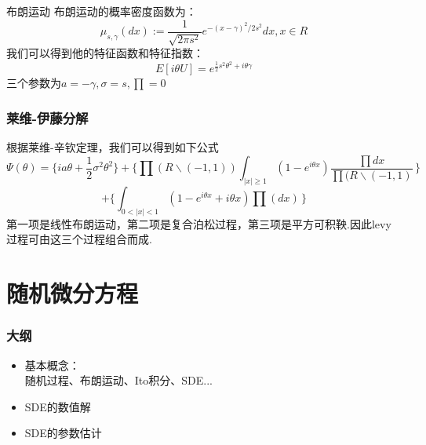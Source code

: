 \documentclass{beamer}
\begin{document}
\begin{frame}
布朗运动\newline\newline
布朗运动的概率密度函数为：\[\mu_{s,\gamma}(dx):=\frac{1}{\sqrt{2\pi s^{2}}}e^{-(x-\gamma)^{2}/2s^{2}}dx ,x \in R\]我们可以得到他的特征函数和特征指数：\[E[i\theta U]=e^{\frac{1}{2}s^{2}\theta^{2}+i\theta\gamma}\]三个参数为$a=-\gamma,\sigma=s,\prod=0$

\end{frame}

\begin{frame}
\frametitle{莱维-伊藤分解}


根据莱维-辛钦定理，我们可以得到如下公式\[\Psi(\theta)=\{ia\theta+\frac{1}{2}\sigma^{2}\theta^{2}\}+\{\prod(R\backslash(-1,1))\int_{|x|\geq1}(1-e^{i\theta x})\frac{\prod{dx}}{\prod(R\backslash(-1,1)} \,\}\]\newline\[+\{\int_{0<|x|<1}(1-e^{i\theta x}+i\theta x)\prod(dx) \,\} \]
第一项是线性布朗运动，第二项是复合泊松过程，第三项是平方可积鞅.因此levy过程可由这三个过程组合而成.

\end{frame}
%
\section{随机微分方程}
 \begin{frame}

\frametitle{大纲}

\begin{itemize}
	\item 基本概念：\\
	随机过程、布朗运动、Ito积分、SDE...
	\item SDE的数值解
	\item SDE的参数估计
	
\end{itemize}



\end{frame}
\end{document}
